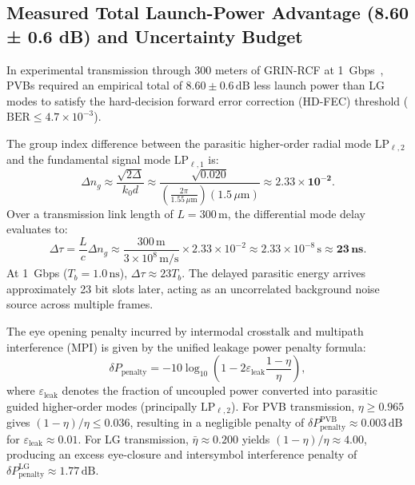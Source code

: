 \documentclass[11pt,a4paper]{article}
\begin{document}
\subsection{Measured Total Launch-Power Advantage (8.60 ± 0.6 dB) and Uncertainty Budget}
\label{sec:rcf_empirical_860db}

In experimental transmission through 300 meters of GRIN-RCF at 1~Gbps~\cite{Villalba2023}, PVBs required an empirical total of $8.60 \pm 0.6\,\text{dB}$ less launch power than LG modes to satisfy the hard-decision forward error correction (HD-FEC) threshold ($\text{BER} \le 4.7 \times 10^{-3}$).

The group index difference between the parasitic higher-order radial mode LP$_{\ell, 2}$ and the fundamental signal mode LP$_{\ell, 1}$ is:
\begin{equation}
\Delta n_g \approx \frac{\sqrt{2\Delta}}{k_0 d} \approx \frac{\sqrt{0.020}}{\left( \frac{2\pi}{1.55\,\mu\text{m}} \right) (1.5\,\mu\text{m})} \approx \mathbf{2.33 \times 10^{-2}}.
\label{eq:dmd_delta_ng}
\end{equation}
Over a transmission link length of $L = 300\,\text{m}$, the differential mode delay evaluates to:
\begin{equation}
\Delta \tau = \frac{L}{c} \Delta n_g \approx \frac{300\,\text{m}}{3 \times 10^8\,\text{m/s}} \times 2.33 \times 10^{-2} \approx 2.33 \times 10^{-8}\,\text{s} \approx \mathbf{23\,\text{ns}}.
\label{eq:dmd_calculation}
\end{equation}
At 1~Gbps ($T_b = 1.0\,\text{ns}$), $\Delta \tau \approx 23 T_b$. The delayed parasitic energy arrives approximately 23 bit slots later, acting as an uncorrelated background noise source across multiple frames.

The eye opening penalty incurred by intermodal crosstalk and multipath interference (MPI) is given by the unified leakage power penalty formula:
\begin{equation}
\delta P_{\text{penalty}} = -10 \log_{10}\left( 1 - 2 \varepsilon_{\text{leak}} \frac{1 - \eta}{\eta} \right),
\label{eq:isi_penalty_formula}
\end{equation}
where $\varepsilon_{\text{leak}}$ denotes the fraction of uncoupled power converted into parasitic guided higher-order modes (principally $\text{LP}_{\ell, 2}$). For PVB transmission, $\eta \ge 0.965$ gives $(1-\eta)/\eta \le 0.036$, resulting in a negligible penalty of $\delta P_{\text{penalty}}^{\text{PVB}} \approx 0.003\,\text{dB}$ for $\varepsilon_{\text{leak}} \approx 0.01$. For LG transmission, $\bar{\eta} \approx 0.200$ yields $(1-\eta)/\eta \approx 4.00$, producing an excess eye-closure and intersymbol interference penalty of $\delta P_{\text{penalty}}^{\text{LG}} \approx 1.77\,\text{dB}$.
\end{document}
